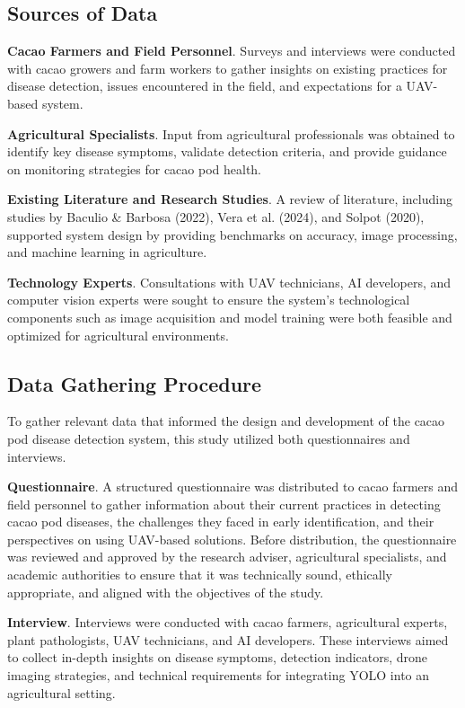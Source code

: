 \subsection*{Sources of Data}
\textbf{Cacao Farmers and Field Personnel}. Surveys and interviews were conducted with cacao growers and farm workers to gather insights on existing practices for disease detection, issues encountered in the field, and expectations for a UAV-based system. 

\textbf{Agricultural Specialists}. Input from agricultural professionals was obtained to identify key disease symptoms, validate detection criteria, and provide guidance on monitoring strategies for cacao pod health.

\textbf{Existing Literature and Research Studies}. A review of literature, including studies by Baculio \& Barbosa (2022), Vera et al. (2024), and Solpot (2020), supported system design by providing benchmarks on accuracy, image processing, and machine learning in agriculture.

\textbf{Technology Experts}. Consultations with UAV technicians, AI developers, and computer vision experts were sought to ensure the system’s technological components such as image acquisition and model training were both feasible and optimized for agricultural environments.

\subsection*{Data Gathering Procedure}

To gather relevant data that informed the design and development of the cacao pod disease detection system, this study utilized both questionnaires and interviews.

\textbf{Questionnaire}. A structured questionnaire was distributed to cacao farmers and field personnel to gather information about their current practices in detecting cacao pod diseases, the challenges they faced in early identification, and their perspectives on using UAV-based solutions. Before distribution, the questionnaire was reviewed and approved by the research adviser, agricultural specialists, and academic authorities to ensure that it was technically sound, ethically appropriate, and aligned with the objectives of the study.

\textbf{Interview}. Interviews were conducted with cacao farmers, agricultural experts, plant pathologists, UAV technicians, and AI developers. These interviews aimed to collect in-depth insights on disease symptoms, detection indicators, drone imaging strategies, and technical requirements for integrating YOLO into an agricultural setting.

